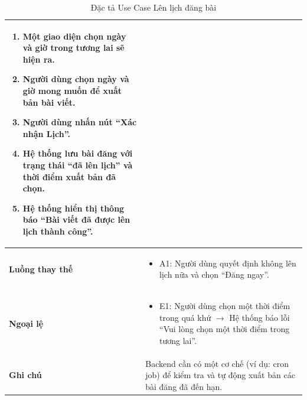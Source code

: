 \begin{table}[H]
\begin{tabularx}{\textwidth}{|l|X|}
\begin{enumerate}
    \item Một giao diện chọn ngày và giờ trong tương lai sẽ hiện ra.
    \item Người dùng chọn ngày và giờ mong muốn để xuất bản bài viết.
    \item Người dùng nhấn nút ``Xác nhận Lịch''.
    \item Hệ thống lưu bài đăng với trạng thái ``đã lên lịch'' và thời điểm xuất bản đã chọn.
    \item Hệ thống hiển thị thông báo ``Bài viết đã được lên lịch thành công''.
\end{enumerate} \\ \hline
\textbf{Luồng thay thế} & 
\begin{itemize}
    \item A1: Người dùng quyết định không lên lịch nữa và chọn ``Đăng ngay''.
\end{itemize} \\ \hline
\textbf{Ngoại lệ} & 
\begin{itemize}
    \item E1: Người dùng chọn một thời điểm trong quá khứ $\rightarrow$ Hệ thống báo lỗi ``Vui lòng chọn một thời điểm trong tương lai''.
\end{itemize} \\ \hline
\textbf{Ghi chú} & Backend cần có một cơ chế (ví dụ: cron job) để kiểm tra và tự động xuất bản các bài đăng đã đến hạn. \\ \hline
\end{tabularx}
\caption{Đặc tả Use Case Lên lịch đăng bài}
\end{table}

